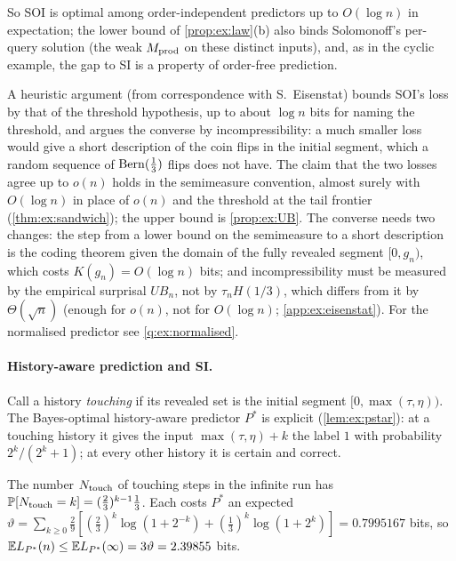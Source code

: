 So SOI is optimal among order-independent predictors up to $O(\log n)$ in expectation; the lower bound of \cref{prop:ex:law}(b) also binds Solomonoff's per-query solution (the weak $M_{\mathrm{prod}}$ on these distinct inputs), and, as in the cyclic example, the gap to SI is a property of order-free prediction.

\begin{remark}\label{rem:ex:email}
A heuristic argument (from correspondence with S.~Eisenstat) bounds SOI's loss by that of the threshold hypothesis, up to about $\log n$ bits for naming the threshold, and argues the converse by incompressibility: a much smaller loss would give a short description of the coin flips in the initial segment, which a random sequence of $\operatorname{Bern}(\frac13)$ flips does not have. The claim that the two losses agree up to $o(n)$ holds in the semimeasure convention, almost surely with $O(\log n)$ in place of $o(n)$ and the threshold at the tail frontier (\cref{thm:ex:sandwich}); the upper bound is \cref{prop:ex:UB}. The converse needs two changes: the step from a lower bound on the semimeasure to a short description is the coding theorem given the domain of the fully revealed segment $[0,g_n)$, which costs $K(g_n)=O(\log n)$ bits; and incompressibility must be measured by the empirical surprisal $UB_n$, not by $\tau_nH(1/3)$, which differs from it by $\Theta(\sqrt n)$ (enough for $o(n)$, not for $O(\log n)$; \cref{app:ex:eisenstat}). For the normalised predictor see \cref{q:ex:normalised}.
\end{remark}

\paragraph{History-aware prediction and SI.} Call a history \emph{touching} if its revealed set is the initial segment $[0,\max(\tau,\eta))$. The Bayes-optimal history-aware predictor $P^*$ is explicit (\cref{lem:ex:pstar}): at a touching history it gives the input $\max(\tau,\eta)+k$ the label $1$ with probability $2^k/(2^k+1)$; at every other history it is certain and correct.

\begin{proposition}\label{prop:ex:burnin}
The number $N_{\rm touch}$ of touching steps in the infinite run has $\mathbb{P}[N_{\rm touch}=k]=(\frac23)^{k-1}\frac13$. Each costs $P^*$ an expected $\vartheta=\sum_{k\ge0}\frac29[(\frac23)^k\log(1+2^{-k})+(\frac13)^k\log(1+2^k)]=0.7995167$ bits, so $\mathbb{E} L_{P^*}(n)\le\mathbb{E} L_{P^*}(\infty)=3\vartheta=2.39855$ bits.
\end{proposition}

